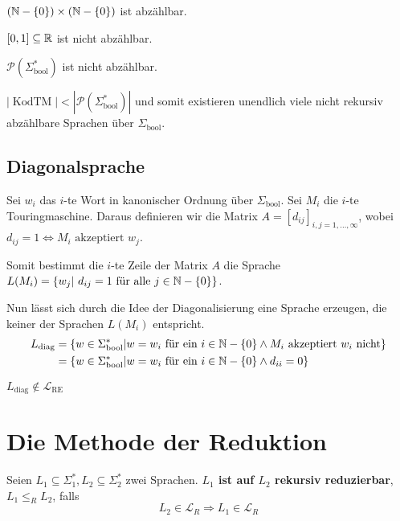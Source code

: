 \begin{lemma}
\( (\mathbb{N} - \{0\}) \times (\mathbb{N} - \{0\}) \) ist abzählbar.\\
\end{lemma}

\begin{satz}
\( [0, 1] \subseteq \mathbb{R} \) ist nicht abzählbar.\\
\end{satz}

\begin{satz}
\( \mathcal{P}(\Sigma_\text{bool}^*) \) ist nicht abzählbar.\\
\end{satz}

\begin{corollary}
\( |\operatorname{KodTM}| < |\mathcal{P}(\Sigma_\text{bool}^*)| \) und somit existieren unendlich viele nicht rekursiv abzählbare Sprachen über \( \Sigma_\text{bool} \).
\end{corollary}

\subsection{Diagonalsprache}
Sei \( w_i \) das \(i\)-te Wort in kanonischer Ordnung über \( \Sigma_\text{bool} \). Sei \(M_i\) die \(i\)-te Touringmaschine. Daraus definieren wir die Matrix \( A = [d_{ij}]_{i,j = 1, \ldots, \infty} \), wobei \( d_{ij} = 1 \Leftrightarrow M_i \text{ akzeptiert } w_j \).

Somit bestimmt die \(i\)-te Zeile der Matrix \(A\) die Sprache \( L(M_i) = \{w_j |\ d_{ij} = 1 \text{ für alle } j \in \mathbb{N} - \{0\}\} \).

Nun lässt sich durch die Idee der Diagonalisierung eine Sprache erzeugen, die keiner der Sprachen \(L(M_i)\) entspricht.
\begin{align*}
L_\text{diag} &= \{ w \in \Sigma_\text{bool}^* | w = w_i \text{ für ein } i \in \mathbb{N} - \{0\} \land M_i \text{ akzeptiert } w_i \text{ nicht} \}\\
&= \{ w \in \Sigma_\text{bool}^* | w = w_i \text{ für ein } i \in \mathbb{N} - \{0\} \land d_{ii} = 0 \}
\end{align*}

\begin{satz}
\( L_\text{diag} \notin \mathcal{L}_\text{RE} \)
\end{satz}

\section{Die Methode der Reduktion}
\begin{definition}
Seien \(L_1 \subseteq \Sigma_1^*, L_2 \subseteq \Sigma_2^*\) zwei Sprachen. \textbf{\( L_1 \) ist auf \( L_2 \) rekursiv reduzierbar}, \( L_1 \leq_R L_2 \), falls \[ L_2 \in \mathcal{L}_R \Rightarrow L_1 \in \mathcal{L}_R \]
\end{definition}

